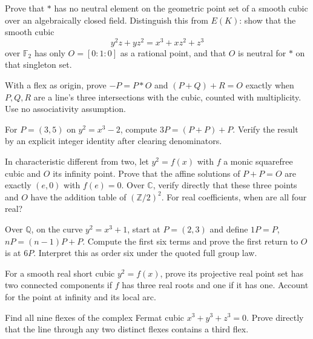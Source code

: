 \begin{exercise}[$\star\star$]\label{geometry:ex:noneutral}
Prove that $*$ has no neutral element on the geometric point set of a smooth cubic over an algebraically closed field. Distinguish this from $E(K)$: show that the smooth cubic
\[
y^2z+yz^2=x^3+xz^2+z^3
\]
over $\mathbb F_2$ has only $O=[0:1:0]$ as a rational point, and that $O$ is neutral for $*$ on that singleton set.
\end{exercise}
\begin{exercise}[$\star$]\label{geometry:ex:collinear}
With a flex as origin, prove $-P=P*O$ and
$(P+Q)+R=O$ exactly when $P,Q,R$ are a line's three intersections with the cubic, counted with multiplicity. Use no associativity assumption.
\end{exercise}
\begin{exercise}[$\star$]\label{geometry:ex:bachet}
For $P=(3,5)$ on $y^2=x^3-2$, compute $3P=(P+P)+P$. Verify the result by an explicit integer identity after clearing denominators.
\end{exercise}
\begin{exercise}[$\star$]\label{geometry:ex:twotorsion}
In characteristic different from two, let $y^2=f(x)$ with $f$ a monic squarefree cubic and $O$ its infinity point. Prove that the affine solutions of $P+P=O$ are exactly $(e,0)$ with $f(e)=0$. Over $\mathbb C$, verify directly that these three points and $O$ have the addition table of $(\mathbb Z/2)^2$. For real coefficients, when are all four real?
\end{exercise}
\begin{exercise}[$\star\star$]\label{geometry:ex:torsionsix}
Over $\mathbb Q$, on the curve $y^2=x^3+1$, start at $P=(2,3)$ and define $1P=P$, $nP=(n-1)P+P$. Compute the first six terms and prove the first return to $O$ is at $6P$. Interpret this as order six under the quoted full group law.
\end{exercise}
\begin{exercise}[$\star$]\label{geometry:ex:realcomponents}
For a smooth real short cubic $y^2=f(x)$, prove its projective real point set has two connected components if $f$ has three real roots and one if it has one. Account for the point at infinity and its local arc.
\end{exercise}
\begin{exercise}[$\star\star$]\label{geometry:ex:fermatflexes}
Find all nine flexes of the complex Fermat cubic $x^3+y^3+z^3=0$. Prove directly that the line through any two distinct flexes contains a third flex.
\end{exercise}
